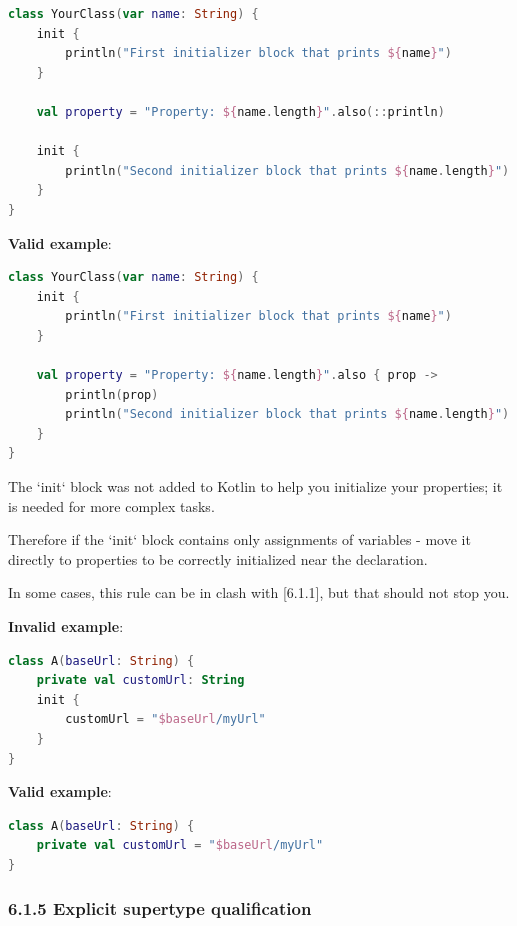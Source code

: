 {{{{\begin{lstlisting}[language=Kotlin]
class YourClass(var name: String) {    
    init {
        println("First initializer block that prints ${name}")
    }
    
    val property = "Property: ${name.length}".also(::println)
    
    init {
        println("Second initializer block that prints ${name.length}")
    }
}
\end{lstlisting}


\textbf{Valid example}:

\begin{lstlisting}[language=Kotlin]
class YourClass(var name: String) {
    init {
        println("First initializer block that prints ${name}")
    }

    val property = "Property: ${name.length}".also { prop ->
        println(prop)
        println("Second initializer block that prints ${name.length}")
    }
}
\end{lstlisting}


The `init` block was not added to Kotlin to help you initialize your properties; it is needed for more complex tasks. 

Therefore if the `init` block contains only assignments of variables - move it directly to properties to be correctly initialized near the declaration.

In some cases, this rule can be in clash with [6.1.1], but that should not stop you.



\textbf{Invalid example}:

\begin{lstlisting}[language=Kotlin]
class A(baseUrl: String) {
    private val customUrl: String
    init {
        customUrl = "$baseUrl/myUrl"
    }
}
\end{lstlisting}


\textbf{Valid example}:

\begin{lstlisting}[language=Kotlin]
class A(baseUrl: String) {
    private val customUrl = "$baseUrl/myUrl"
}
\end{lstlisting}


\subsubsection*{\textbf{6.1.5 Explicit supertype qualification}}
\leavevmode\newline

}}}}
